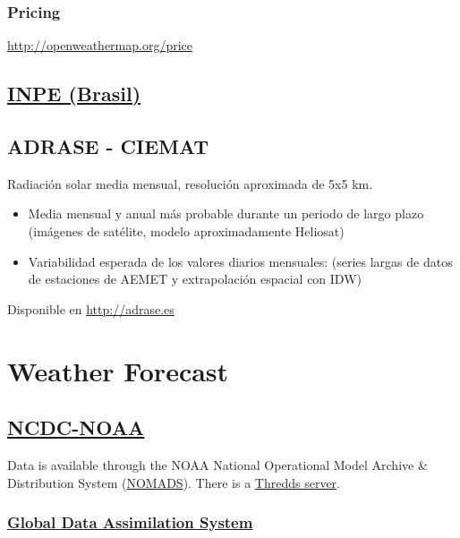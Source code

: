 \documentclass[11pt]{article}
\begin{document}
\subsubsection{Pricing}
\label{sec-1-11-2}
\url{http://openweathermap.org/price}

\subsection{\href{http://www.dgi.inpe.br/CDSR/}{INPE (Brasil)}}
\label{sec-1-12}



\subsection{ADRASE - CIEMAT}
\label{sec-1-13}
Radiación solar media mensual, resolución aproximada de 5x5 km.
\begin{itemize}
\item Media mensual y anual más probable durante un periodo de largo
plazo (imágenes de satélite, modelo aproximadamente Heliosat)
\item Variabilidad esperada de los valores diarios mensuales: (series
largas de datos de estaciones de AEMET y extrapolación espacial
con IDW)
\end{itemize}
Disponible en \url{http://adrase.es}

\section{Weather Forecast}
\label{sec-2}

\subsection{\href{http://www.ncdc.noaa.gov/model-data/numerical-weather-prediction}{NCDC-NOAA}}
\label{sec-2-1}

Data is available through the NOAA National Operational Model Archive
\& Distribution System (\href{http://nomads.ncdc.noaa.gov/}{NOMADS}). There is a \href{http://nomads.ncdc.noaa.gov/thredds/catalog.html}{Thredds server}.


\subsubsection{\href{http://www.emc.ncep.noaa.gov/gmb/gdas/}{Global Data Assimilation System}}
\label{sec-2-1-1}
\end{document}
